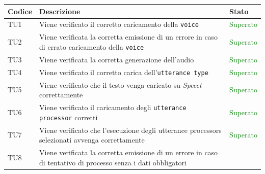 \documentclass[openany,12pt,a4paper]{report}
\begin{document}
\setlength\LTleft{6mm}
\begin{longtable}[c]{| p{2.5cm} |p{8cm} | p{2.5cm} |}
	\hline
	\textbf{Codice} & \textbf{Descrizione} & \textbf{Stato}\\
	\hline
	\endhead
	\newline TU1&
	\newline Viene verificato il corretto caricamento della \verb|voice|&
	\newline \textcolor{green}{Superato}
	\\[1em]
	\hline
	\newline TU2&
	\newline Viene verificata la corretta emissione di un errore in caso di errato caricamento della \verb|voice|&
	\newline \textcolor{green}{Superato}
	\\[1em]
	\hline
	\newline TU3&
	\newline Viene verificata la corretta generazione dell'audio&
	\newline \textcolor{green}{Superato}
	\\[1em]
	\hline
	\newline TU4&
	\newline Viene verificato il corretto carica dell'\verb|utterance type|&
	\newline \textcolor{green}{Superato}
	\\[1em]
	\hline
	\newline TU5&
	\newline Viene verificato che il testo venga caricato su \textit{Speect} correttamente&
	\newline \textcolor{green}{Superato}
	\\[1em]
	\hline
	\newline TU6&
	\newline Viene verificato il caricamento degli \verb|utterance processor| corretti&
	\newline \textcolor{green}{Superato}
	\\[1em]
	\hline
	\newline TU7&
	\newline Viene verificato che l'esecuzione degli utterance processors selezionati avvenga correttamente&
	\newline \textcolor{green}{Superato}
	\\[1em]
	\hline
	\newline TU8&
	\newline Viene verificata la corretta emissione di un errore in caso di tentativo di processo senza i dati obbligatori&

\end{longtable}
\end{document}
